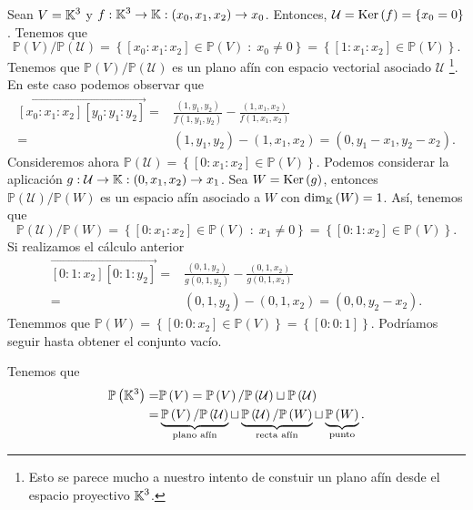 \begin{eg}
	Sean $\displaystyle V = \mathbb{K}^{3} $ y $\displaystyle f: \mathbb{K}^{3} \to \mathbb{K} : \left(x_{0}, x_{1}, x_{2}\right) \to x_{0} $. Entonces, $\displaystyle \mathcal{U} = \operatorname{Ker}\left(f\right) = \left\{ x_{0} = 0\right\}  $. Tenemos que
	\[\mathbb{P}\left(V\right) / \mathbb{P}\left(\mathcal{U}\right) = \left\{ [x_{0} : x_{1} : x_{2}] \in \mathbb{P}\left(V\right) \; : \; x_{0} \neq 0\right\} = \left\{ [1:x_{1}:x_{2}] \in \mathbb{P}\left(V\right)\right\}  .\]
	Tenemos que $\displaystyle \mathbb{P}\left(V\right) / \mathbb{P}\left(\mathcal{U}\right) $ es un plano afín con espacio vectorial asociado $\displaystyle \mathcal{U} $ \footnote{Esto se parece mucho a nuestro intento de constuir un plano afín desde el espacio proyectivo $\displaystyle \mathbb{K}^{3} $.}. En este caso podemos observar que
\[
\begin{split}
	\overrightarrow{[x_{0}:x_{1}:x_{2}][y_{0}:y_{1}:y_{2}]}  = & \frac{\left(1,y_{1}, y_{2}\right)}{f\left(1,y_{1}, y_{2}\right)} - \frac{\left(1, x_{1}, x_{2}\right)}{f\left(1,x_{1}, x_{2}\right)} \\
	= &  \left(1, y_{1}, y_{2}\right) - \left(1, x_{1}, x_{2}\right) = \left(0, y_{1}-x_{1}, y_{2}-x_{2}\right) .
\end{split}
\]
Consideremos ahora $\displaystyle \mathbb{P}\left(\mathcal{U}\right) = \left\{ [0:x_{1}:x_{2}] \in \mathbb{P}\left(V\right)\right\}  $. Podemos considerar la aplicación $\displaystyle g : \mathcal{U} \to \mathbb{K} : \left(0, x_{1}, x_{2}\right) \to x_{1} $. Sea $\displaystyle W = \operatorname{Ker}\left(g\right) $, entonces $\displaystyle \mathbb{P}\left(\mathcal{U}\right) / \mathbb{P}\left(W\right) $ es un espacio afín asociado a $\displaystyle W $ con $\displaystyle \dim_{\mathbb{K}}\left(W\right) = 1 $. 
Así, tenemos que 
\[\mathbb{P}\left(\mathcal{U}\right) / \mathbb{P}\left(W\right) = \left\{ [0:x_{1}:x_{2}] \in \mathbb{P}\left(V\right) \; : \; x_{1} \neq 0\right\} = \left\{ [0:1:x_{2}] \in \mathbb{P}\left(V\right)\right\}  .\]
Si realizamos el cálculo anterior
\[
\begin{split}
	\overrightarrow{[0:1:x_{2}][0:1:y_{2}]} = & \frac{\left(0,1,y_{2}\right)}{g\left(0,1,y_{2}\right)} - \frac{\left(0,1,x_{2}\right)}{g\left(0,1,x_{2}\right)} \\
	= &  \left(0,1,y_{2}\right) - \left(0,1,x_{2}\right) = \left(0,0,y_{2}-x_{2}\right) .
\end{split}
\]
Tenemmos que $\displaystyle \mathbb{P}\left(W\right) = \left\{ [0:0:x_{2}] \in \mathbb{P}\left(V\right)\right\} = \left\{ [0:0:1]\right\}  $. Podríamos seguir hasta obtener el conjunto vacío. 
\end{eg}
\begin{observation}
Tenemos que
\[
\begin{split}
	\mathbb{P}\left(\mathbb{K}^{3}\right) = & \mathbb{P}\left(V\right) = \mathbb{P}\left(V\right) / \mathbb{P}\left(\mathcal{U}\right) \sqcup \mathbb{P}\left(\mathcal{U}\right)\\
	= & \underbrace{\mathbb{P}\left(V\right) / \mathbb{P}\left(\mathcal{U}\right)}_{\text{plano afín}} \sqcup \underbrace{\mathbb{P}\left(\mathcal{U}\right)/\mathbb{P}\left(W\right)}_{\text{recta afín}} \sqcup \underbrace{\mathbb{P}\left(W\right)}_{\text{punto}}.
\end{split}
\]
\end{observation}
